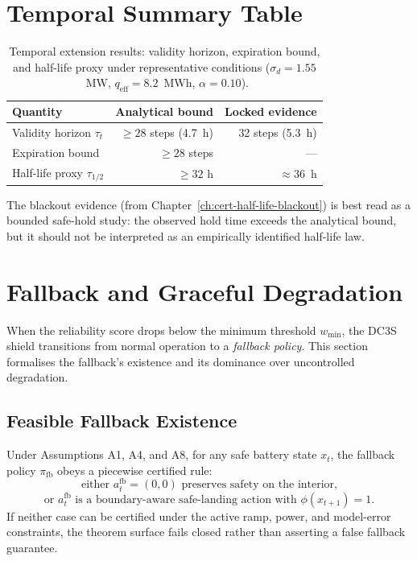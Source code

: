\section{Temporal Summary Table}

\begin{table}[ht]
\centering
\caption{Temporal extension results: validity horizon, expiration bound,
  and half-life proxy under representative conditions
  ($\sigma_d = 1.55$~MW, $q_{\text{eff}} = 8.2$~MWh, $\alpha = 0.10$).}
\label{tab:temporal-summary}
\begin{tabular}{lrr}
\toprule
\textbf{Quantity} & \textbf{Analytical bound} & \textbf{Locked evidence} \\
\midrule
Validity horizon $\tau_t$ & $\ge 28$ steps (4.7~h) & 32 steps (5.3~h) \\
Expiration bound & $\ge 28$ steps & --- \\
Half-life proxy $\tau_{1/2}$ & $\ge 32$ h & $\approx 36$~h \\
\bottomrule
\end{tabular}
\end{table}

The blackout evidence (from Chapter~\ref{ch:cert-half-life-blackout}) is
best read as a bounded safe-hold study: the observed hold time exceeds the
analytical bound, but it should not be interpreted as an empirically
identified half-life law.


\section{Fallback and Graceful Degradation}

When the reliability score drops below the minimum threshold
$w_{\min}$, the DC3S shield transitions from normal operation to
a \emph{fallback policy}.  This section formalises the fallback's
existence and its dominance over uncontrolled degradation.

\subsection{Feasible Fallback Existence}

\begin{theorem}
\label{thm:fallback-existence}
Under Assumptions A1, A4, and A8, for any safe battery state $x_t$, the
fallback policy $\pi_{\text{fb}}$ obeys a piecewise certified rule:
\[
  \text{either } a_t^{\text{fb}} = (0,0) \text{ preserves safety on the interior,}
\]
\[
  \text{or } a_t^{\text{fb}} \text{ is a boundary-aware safe-landing action with }
  \phi(x_{t+1}) = 1.
\]
If neither case can be certified under the active ramp, power, and model-error
constraints, the theorem surface fails closed rather than asserting a false
fallback guarantee.
\end{theorem}

